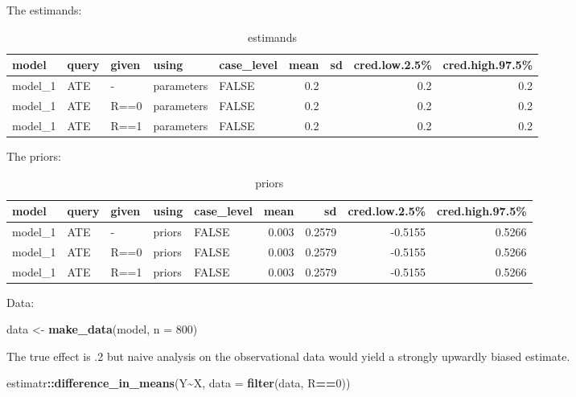 \documentclass[
  12pt,
]{book}
\newenvironment{Shaded}{\begin{snugshade}}{\end{snugshade}}
\newcommand{\AttributeTok}[1]{\textcolor[rgb]{0.13,0.29,0.53}{#1}}
\newcommand{\DecValTok}[1]{\textcolor[rgb]{0.00,0.00,0.81}{#1}}
\newcommand{\FunctionTok}[1]{\textcolor[rgb]{0.13,0.29,0.53}{\textbf{#1}}}
\newcommand{\NormalTok}[1]{#1}
\newcommand{\OtherTok}[1]{\textcolor[rgb]{0.56,0.35,0.01}{#1}}
\newcommand{\SpecialCharTok}[1]{\textcolor[rgb]{0.81,0.36,0.00}{\textbf{#1}}}
\begin{document}
The estimands:

\begin{table}

\caption{\label{tab:unnamed-chunk-115}estimands}
\centering
\begin{tabular}[t]{l|l|l|l|l|r|r|r|r}
\hline
model & query & given & using & case\_level & mean & sd & cred.low.2.5\% & cred.high.97.5\%\\
\hline
model\_1 & ATE & - & parameters & FALSE & 0.2 &  & 0.2 & 0.2\\
\hline
model\_1 & ATE & R==0 & parameters & FALSE & 0.2 &  & 0.2 & 0.2\\
\hline
model\_1 & ATE & R==1 & parameters & FALSE & 0.2 &  & 0.2 & 0.2\\
\hline
\end{tabular}
\end{table}

The priors:

\begin{table}

\caption{\label{tab:appcombexpobs2}priors}
\centering
\begin{tabular}[t]{l|l|l|l|l|r|r|r|r}
\hline
model & query & given & using & case\_level & mean & sd & cred.low.2.5\% & cred.high.97.5\%\\
\hline
model\_1 & ATE & - & priors & FALSE & 0.003 & 0.2579 & -0.5155 & 0.5266\\
\hline
model\_1 & ATE & R==0 & priors & FALSE & 0.003 & 0.2579 & -0.5155 & 0.5266\\
\hline
model\_1 & ATE & R==1 & priors & FALSE & 0.003 & 0.2579 & -0.5155 & 0.5266\\
\hline
\end{tabular}
\end{table}

Data:

\begin{Shaded}
\begin{Highlighting}[]
\NormalTok{data }\OtherTok{\textless{}{-}} \FunctionTok{make\_data}\NormalTok{(model, }\AttributeTok{n =} \DecValTok{800}\NormalTok{)}
\end{Highlighting}
\end{Shaded}

The true effect is .2 but naive analysis on the observational data would yield a strongly upwardly biased estimate.

\begin{Shaded}
\begin{Highlighting}[]
\NormalTok{estimatr}\SpecialCharTok{::}\FunctionTok{difference\_in\_means}\NormalTok{(Y}\SpecialCharTok{\textasciitilde{}}\NormalTok{X, }\AttributeTok{data =} \FunctionTok{filter}\NormalTok{(data, R}\SpecialCharTok{==}\DecValTok{0}\NormalTok{))}
\end{Highlighting}
\end{Shaded}
\end{document}
